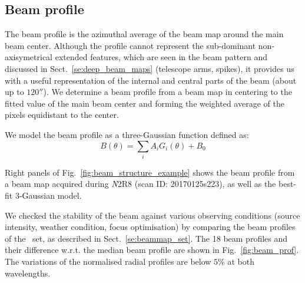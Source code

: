 

\subsection{Beam profile}
\label{se:fullbeam_prof}

The beam profile is the azimuthal average of the beam map around the
main beam center. Although the profile cannot represent the sub-dominant non-axisymetrical
extended features, which are seen in the beam pattern and discussed in
Sect.~\ref{se:deep_beam_maps} (telescope arms, spikes), it provides us with a useful
representation of the internal and central parts of the beam (about up to
$120''$). We determine a beam profile from a beam map in centering to
the fitted value of the main beam center and forming the
weighted average of the pixels equidistant to the center.

We model the beam profile as a three-Gaussian function defined as:
\begin{equation}
  B(\theta) = \sum_i A_i G_i(\theta) + B_0
\end{equation}

Right panels of Fig.~\ref{fig:beam_structure_example} shows the beam
profile from a beam map acquired during {\emph N2R8} (scan ID:
20170125s223), as well as the best-fit 3-Gaussian model. 




We checked the stability of the beam against various observing
conditions (source intensity, weather condition, focus optimisation) by
comparing the beam profiles of the \bm\ set, as described in
Sect.~\ref{se:beammap_set}. The 18 beam profiles and their difference
w.r.t. the median beam profile are shown in Fig.~\ref{fig:beam_prof}.
The variations of the normalised radial profiles are below $5\%$ at
both wavelengths.


